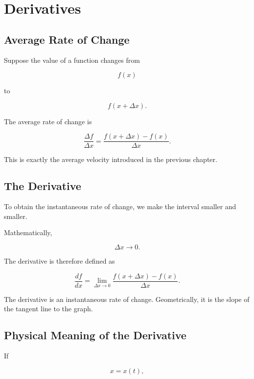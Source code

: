 \section{Derivatives}
\label{sec:derivatives}

\subsection{Average Rate of Change}

Suppose the value of a function changes from

\[
f(x)
\]

to

\[
f(x+\Delta x).
\]

The average rate of change is

\[
\boxed{
	\frac{\Delta f}{\Delta x}
	=
	\frac{f(x+\Delta x)-f(x)}
	{\Delta x}.
}
\]

This is exactly the average velocity introduced in the previous chapter.


\subsection{The Derivative}

To obtain the instantaneous rate of change, we make the interval
smaller and smaller.

Mathematically,

\[
\Delta x\rightarrow0.
\]

The derivative is therefore defined as

\[
\boxed{
	\frac{df}{dx}
	=
	\lim_{\Delta x\rightarrow0}
	\frac{f(x+\Delta x)-f(x)}
	{\Delta x}.
}
\]

\begin{keyidea}
The derivative is an instantaneous rate of change. Geometrically, it is the
slope of the tangent line to the graph.
\end{keyidea}


\subsection{Physical Meaning of the Derivative}

If

\[
x=x(t),
\]

